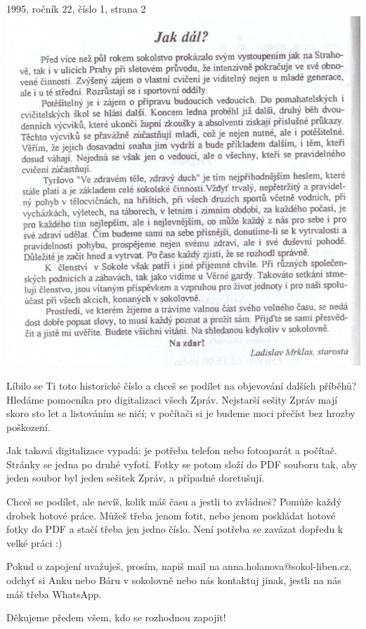 \documentclass[11pt]{article}
\begin{document}
1995, ročník 22, číslo 1, strana 2 \\
\includegraphics[width=\imagewidth]{original/1995/Skener_20250320 (13).jpg}

\clearpage


Líbilo se Ti toto historické číslo a chceš se podílet na objevování
dalších příběhů? Hledáme pomocníka pro digitalizaci všech Zpráv.
Nejstarší sešity Zpráv mají skoro sto let a listováním se ničí; v
počítači si je budeme moci přečíst bez hrozby poškození.

Jak taková digitalizace vypadá: je potřeba telefon nebo fotoaparát a
počítač. Stránky se jedna po druhé vyfotí. Fotky se potom složí do PDF
souboru tak, aby jeden soubor byl jeden sešitek Zpráv, a případně
doretušují.

Chceš se podílet, ale nevíš, kolik máš času a jestli to zvládneš? Pomůže
každý drobek hotové práce. Můžeš třeba jenom fotit, nebo jenom poskládat
hotové fotky do PDF a stačí třeba jen jedno číslo. Není potřeba se
zavázat dopředu k velké práci :)

Pokud o zapojení uvažuješ, prosím, napiš mail na anna.holanova@sokol-liben.cz,
odchyť si Anku nebo Báru v sokolovně nebo nás kontaktuj jinak, jestli na
nás máš třeba WhatsApp.

Děkujeme předem všem, kdo se rozhodnou zapojit!
\end{document}
